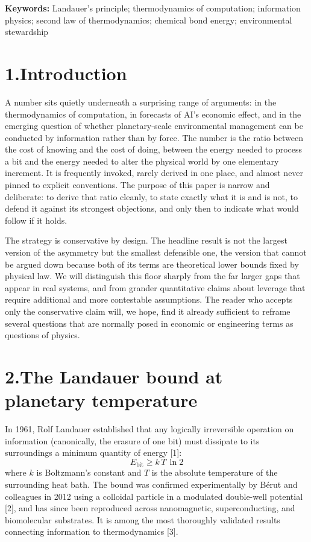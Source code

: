\documentclass[11pt]{article}
\begin{document}
\textbf{Keywords:} Landauer's principle; thermodynamics of computation; information physics; second law of thermodynamics; chemical bond energy; environmental stewardship

\section*{1.\quad Introduction}
A number sits quietly underneath a surprising range of arguments: in the thermodynamics of computation, in forecasts of AI's economic effect, and in the emerging question of whether planetary-scale environmental management can be conducted by information rather than by force. The number is the ratio between the cost of knowing and the cost of doing, between the energy needed to process a bit and the energy needed to alter the physical world by one elementary increment. It is frequently invoked, rarely derived in one place, and almost never pinned to explicit conventions. The purpose of this paper is narrow and deliberate: to derive that ratio cleanly, to state exactly what it is and is not, to defend it against its strongest objections, and only then to indicate what would follow if it holds.

The strategy is conservative by design. The headline result is not the largest version of the asymmetry but the smallest defensible one, the version that cannot be argued down because both of its terms are theoretical lower bounds fixed by physical law. We will distinguish this floor sharply from the far larger gaps that appear in real systems, and from grander quantitative claims about leverage that require additional and more contestable assumptions. The reader who accepts only the conservative claim will, we hope, find it already sufficient to reframe several questions that are normally posed in economic or engineering terms as questions of physics.

\section*{2.\quad The Landauer bound at planetary temperature}
In 1961, Rolf Landauer established that any logically irreversible operation on information (canonically, the erasure of one bit) must dissipate to its surroundings a minimum quantity of energy [1]:
\[
E_{\text{bit}} \geq k\,T\,\ln 2
\]
where $k$ is Boltzmann's constant and $T$ is the absolute temperature of the surrounding heat bath. The bound was confirmed experimentally by B\'erut and colleagues in 2012 using a colloidal particle in a modulated double-well potential [2], and has since been reproduced across nanomagnetic, superconducting, and biomolecular substrates. It is among the most thoroughly validated results connecting information to thermodynamics [3].
\end{document}
